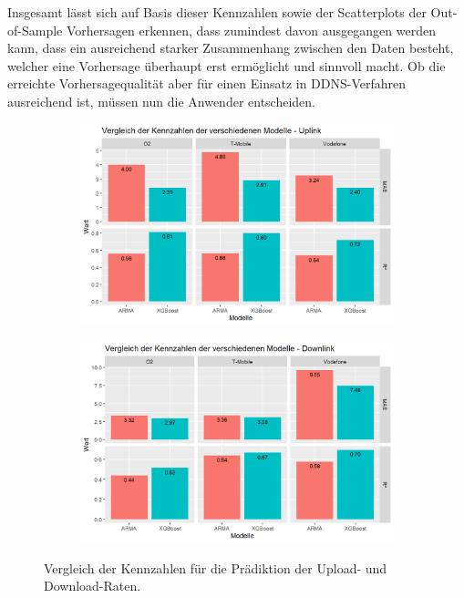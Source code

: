 Insgesamt l\"asst sich auf Basis dieser Kennzahlen sowie der Scatterplots der Out-of-Sample Vorhersagen erkennen, dass zumindest
davon ausgegangen werden kann, dass ein ausreichend starker Zusammenhang zwischen den Daten besteht, welcher eine Vorhersage
\"uberhaupt erst erm\"oglicht und sinnvoll macht.
Ob die erreichte Vorhersagequalit\"at aber f\"ur einen Einsatz in DDNS-Verfahren ausreichend ist,
m\"ussen nun die Anwender entscheiden.
\begin{figure}
\centering
\begin{subfigure}{0.49\textwidth}
    \centering
    \includegraphics[width=\textwidth]{abbildungen/kennzahlen_vergleich_uplink}
\end{subfigure}
\begin{subfigure}{0.49\textwidth}
    \centering
    \includegraphics[width=\textwidth]{abbildungen/kennzahlen_vergleich_downlink}
\end{subfigure}
\caption{Vergleich der Kennzahlen f\"ur die Pr\"adiktion der Upload- und Download-Raten.}
\label{fig:kennzahlen-datarate}
\end{figure}

